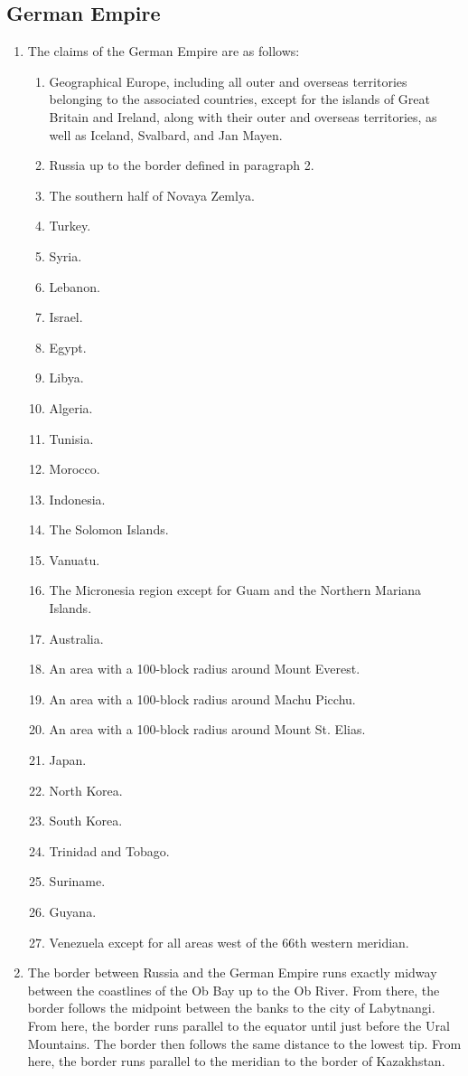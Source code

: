 \documentclass{article}
\begin{document}
\subsection{German Empire}\label{german}
\begin{enumerate}[(1)]
    \item The claims of the German Empire are as follows:
    \begin{enumerate}[1.]
        \item Geographical Europe, including all outer and overseas territories belonging to the associated countries, except for the islands of Great Britain and Ireland, along with their outer and overseas territories, as well as Iceland, Svalbard, and Jan Mayen.
        \item Russia up to the border defined in paragraph 2.
        \item The southern half of Novaya Zemlya.
        \item Turkey.
        \item Syria.
        \item Lebanon.
        \item Israel.
        \item Egypt.
        \item Libya.
        \item Algeria.
        \item Tunisia.
        \item Morocco.
        \item Indonesia.
        \item The Solomon Islands.
        \item Vanuatu.
        \item The Micronesia region except for Guam and the Northern Mariana Islands.
        \item Australia.
        \item An area with a 100-block radius around Mount Everest.
        \item An area with a 100-block radius around Machu Picchu.
        \item An area with a 100-block radius around Mount St. Elias.
        \item Japan.
        \item North Korea.
        \item South Korea.
        \item Trinidad and Tobago.
        \item Suriname.
        \item Guyana.
        \item Venezuela except for all areas west of the 66th western meridian.
    \end{enumerate}
    \item The border between Russia and the German Empire runs exactly midway between the coastlines of the Ob Bay up to the Ob River. From there, the border follows the midpoint between the banks to the city of Labytnangi. From here, the border runs parallel to the equator until just before the Ural Mountains. The border then follows the same distance to the lowest tip. From here, the border runs parallel to the meridian to the border of Kazakhstan.
\end{enumerate}
\end{document}
